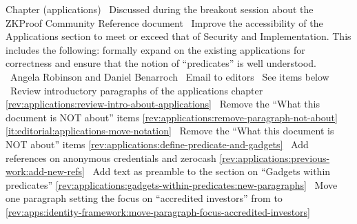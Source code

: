 Chapter (applications)
\newcol \ccontext\ Discussed during the breakout session about the ZKProof Community Reference document
				\propContrib\ Improve the accessibility of the Applications section to meet or exceed that of Security and Implementation. 
				This includes the following: formally expand on the existing applications for correctness and ensure that the notion of ``predicates'' is well understood.
\newcol {}
\newcol \contributors\ Angela Robinson and Daniel Benarroch
				\submit\ Email to editors
				\Chan\ See items below
\newcol 
\rowendL
\newcol
\newcol 
\newcol \Chan\ Review introductory paragraphs of the applications chapter
\newcol \ref{rev:applications:review-intro-about-applications}
\rowendL
\newcol
\newcol 
\newcol \Chan\ Remove the ``What this document is NOT about'' items
\newcol \ref{rev:applications:remove-paragraph-not-about}
\rowendL
\newcol
\newcol \ref{it:editorial:applications-move-notation}
\newcol \Chan\ Remove the ``What this document is NOT about'' items
\newcol \ref{rev:applications:define-predicate-and-gadgets}
\rowendL
\newcol
\newcol 
\newcol \Chan\ Add references on anonymous credentials and zerocash
\newcol \ref{rev:applications:previous-work:add-new-refs}
\rowendL
\newcol
\newcol 
\newcol \Chan\ Add text as preamble to the section on ``Gadgets within predicates''
\newcol \ref{rev:applications:gadgets-within-predicates:new-paragraphs}
\rowendL
\newcol
\newcol 
\newcol \Chan\ Move one paragraph setting the focus on ``accredited investors'' from 
 to 
\newcol \ref{rev:apps:identity-framework:move-paragraph-focus-accredited-investors}
\rowendL
\myendIssue




